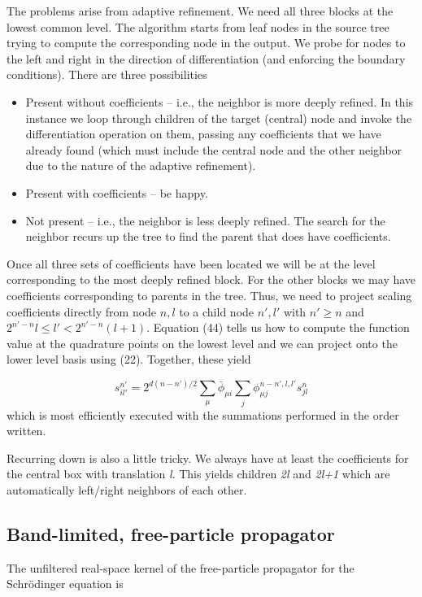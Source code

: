 \documentclass[letterpaper]{book}
\begin{document}
The problems arise from adaptive refinement. We need all three blocks at the lowest common level. The algorithm starts
from leaf nodes in the source tree trying to compute the corresponding node in the output. We probe for nodes to the
left and right in the direction of differentiation (and enforcing the boundary conditions). There are three
possibilities


\begin{itemize}
\item Present without coefficients -- i.e., the neighbor is more deeply refined. In this instance we loop through
children of the target (central) node and invoke the differentiation operation on them, passing any coefficients that
we have already found (which must include the central node and the other neighbor due to the nature of the adaptive
refinement).
\item Present with coefficients -- be happy.
\item Not present -- i.e., the neighbor is less deeply refined. The search for the neighbor recurs up the tree to find
the parent that does have coefficients.
\end{itemize}
Once all three sets of coefficients have been located we will be at the level corresponding to the most deeply refined
block. For the other blocks we may have coefficients corresponding to parents in the tree. Thus, we need to project
scaling coefficients directly from node  $n,l$ to a child node  $n',l'$ with  $n'\ge n$ and  $2^{n'-n}l\le
l'<2^{n'-n}(l+1)$. Equation (44) tells us how to compute the function value at the quadrature points on the lowest
level and we can project onto the lower level basis using (22). Together, these yield

\begin{equation}
s_{il'}^{n'}=2^{d(n-n')/2}\sum _{\mu }{{\bar{\phi }}_{\mu i}\sum _{j}{\phi _{\mu j}^{n-n',l,l'}s_{\mathit{jl}}^{n}}}
\end{equation}
which is most efficiently executed with the summations performed in the order written.

Recurring down is also a little tricky. We always have at least the coefficients for the central box with translation
\textit{l}. This yields children \textit{2l} and \textit{2l+1} which are automatically left/right neighbors of each
other.

\subsection{Band-limited, free-particle propagator}
The unfiltered real-space kernel of the free-particle propagator for the Schr\"odinger equation is 
\end{document}
